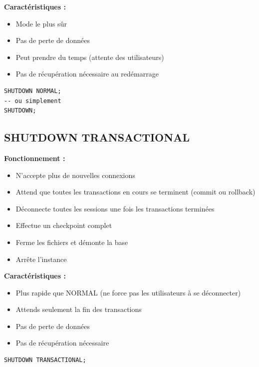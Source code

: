 \documentclass[11pt,a4paper]{article}
\begin{document}
\textbf{Caractéristiques :}
\begin{itemize}
    \item Mode le plus sûr
    \item Pas de perte de données
    \item Peut prendre du temps (attente des utilisateurs)
    \item Pas de récupération nécessaire au redémarrage
\end{itemize}

\begin{commandebox}
\begin{lstlisting}
SHUTDOWN NORMAL;
-- ou simplement
SHUTDOWN;
\end{lstlisting}
\end{commandebox}

\subsection{SHUTDOWN TRANSACTIONAL}

\textbf{Fonctionnement :}
\begin{itemize}
    \item N'accepte plus de nouvelles connexions
    \item Attend que toutes les transactions en cours se terminent (commit ou rollback)
    \item Déconnecte toutes les sessions une fois les transactions terminées
    \item Effectue un checkpoint complet
    \item Ferme les fichiers et démonte la base
    \item Arrête l'instance
\end{itemize}

\textbf{Caractéristiques :}
\begin{itemize}
    \item Plus rapide que NORMAL (ne force pas les utilisateurs à se déconnecter)
    \item Attends seulement la fin des transactions
    \item Pas de perte de données
    \item Pas de récupération nécessaire
\end{itemize}

\begin{commandebox}
\begin{lstlisting}
SHUTDOWN TRANSACTIONAL;
\end{lstlisting}
\end{commandebox}
\end{document}
